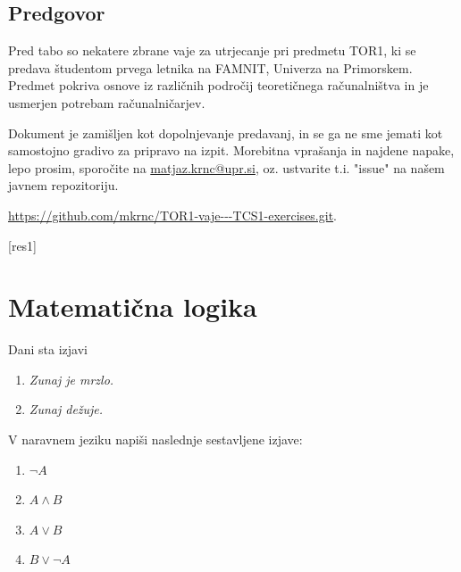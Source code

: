 \documentclass[11pt,paper=b5,footinclude,headinclude]{scrbook} %
\newtheorem{ex}{Vaja\hypertarget{sol:\theex}}[chapter]
\begin{document}



\newpage
\section*{Predgovor}
Pred tabo so nekatere zbrane vaje za utrjecanje pri predmetu TOR1, ki se predava študentom prvega letnika na FAMNIT, Univerza na Primorskem.
Predmet pokriva osnove iz različnih področij teoretičnega računalništva in je usmerjen potrebam računalničarjev.


Dokument je zamišljen kot dopolnjevanje predavanj, in se ga ne sme jemati kot samostojno gradivo za pripravo na izpit. 
Morebitna vprašanja in najdene napake, lepo prosim, sporočite na
\url{matjaz.krnc@upr.si}, oz. ustvarite t.i. "issue"\xspace na našem javnem repozitoriju.
\begin{center}
    \url{https://github.com/mkrnc/TOR1-vaje---TCS1-exercises.git}.    
\end{center}





\tableofcontents

[res1] 

\chapter{Matematična logika}


\begin{ex}
Dani sta izjavi 
\begin{enumerate}[A:]
    \item \emph{Zunaj je mrzlo.}
    \item \emph{Zunaj dežuje.}
\end{enumerate}
V naravnem jeziku napiši naslednje sestavljene izjave:
\begin{enumerate}
  \item $\neg A$
  \item $A \land B$
  \item $A \lor B$
  \item $B \lor \neg A$
\end{enumerate}
\end{ex}
\end{document}
